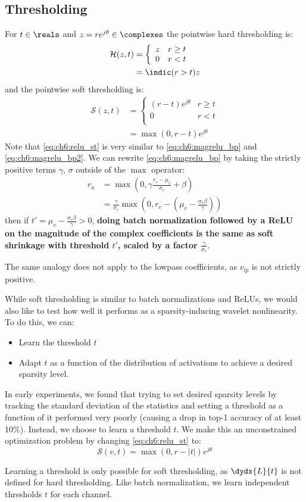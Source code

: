 \subsection{Thresholding}
For $t \in \reals$ and $z = re^{j\theta} \in \complexes$ the pointwise hard thresholding is:
\begin{align}
  \mathcal{H}(z, t) &= \left\{ \begin{array}{ll}
    z & r \geq t \\
    0 & r < t\\
  \end{array} \right. \\
  &= \indic(r > t) z
\end{align}
and the pointwise soft thresholding is:
\begin{align}
  \mathcal{S}(z, t) &= \left\{ \begin{array}{ll}
    (r-t)e^{j\theta} & r \geq t \\
    0 & r < t\\
  \end{array} \right. \\
  &= \max(0, r - t)e^{j\theta} \label{eq:ch6:relu_st}
\end{align}
Note that \eqref{eq:ch6:relu_st} is very similar to \eqref{eq:ch6:magrelu_bp} and \eqref{eq:ch6:magrelu_bp2}.
We can rewrite \eqref{eq:ch6:magrelu_bp} by taking the strictly positive terms
$\gamma$, $\sigma$ outside of the $\max$ operator:
\begin{align}
  r_u &= \max(0, \gamma \frac{r_v-\mu_r}{\sigma_r} + \beta) \\
      &= \frac{\gamma}{\sigma_r}\max\left(0, r_v - \left(\mu_r - \frac{\sigma_r\beta}{\gamma}\right)\right) \label{eq:ch6:bnrelu_soft}
\end{align}
then if $t' = \mu_v - \frac{\sigma_r\beta}{\gamma} > 0$, \textbf{doing batch
normalization followed by a ReLU on the magnitude of the complex coefficients is the
same as soft shrinkage with threshold $t'$, scaled by a factor
$\frac{\gamma}{\sigma_r}$}.

The same analogy does not apply to the lowpass
coefficients, as $v_{lp}$ is not strictly positive.

While soft thresholding is similar to batch normalizations and ReLUs, we would also like
to test how well it performs as a sparsity-inducing wavelet nonlinearity.
To do this, we can:
\begin{itemize}
  \item Learn the threshold $t$
  \item Adapt $t$ as a function of the distribution of activations to achieve a desired sparsity level.
\end{itemize}
In early experiments, we found that trying to set
desired sparsity levels by tracking the standard deviation of the statistics
and setting a threshold as a function of it performed very poorly (causing a
drop in top-1 accuracy of at least 10\%).
Instead, we choose to learn a threshold $t$. We make this an unconstrained
optimization problem by changing \eqref{eq:ch6:relu_st} to:
\begin{equation}
  \mathcal{S}(v, t) = \max(0, r-|t|)e^{j\theta}  \label{eq:ch6:relu_st2}
\end{equation}

Learning a threshold is only possible for soft thresholding, as $\dydx{L}{t}$ is
not defined for hard thresholding. Like batch normalization, we learn
independent thresholds $t$ for each channel.
